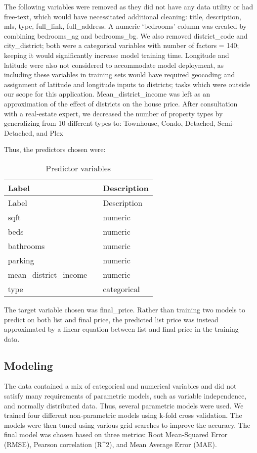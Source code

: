 \documentclass[11pt,]{article}
\begin{document}
The following variables were removed as they did not have any data
utility or had free-text, which would have necessitated additional
cleaning: title, description, mls, type, full\_link, full\_address. A
numeric `bedrooms' column was created by combining bedrooms\_ag and
bedrooms\_bg. We also removed district\_code and city\_district; both
were a categorical variables with number of factors = 140; keeping it
would significantly increase model training time. Longitude and latitude
were also not considered to accommodate model deployment, as including
these variables in training sets would have required geocoding and
assignment of latitude and longitude inputs to districts; tasks which
were outside our scope for this application. Mean\_district\_income was
left as an approximation of the effect of districts on the house price.
After consultation with a real-estate expert, we decreased the number of
property types by generalizing from 10 different types to: Townhouse,
Condo, Detached, Semi-Detached, and Plex

Thus, the predictors chosen were:

\begin{longtable}[]{@{}lll@{}}
\caption{Predictor variables}\tabularnewline
\toprule
Label & & Description\tabularnewline
\midrule
\endfirsthead
\toprule
Label & & Description\tabularnewline
\midrule
\endhead
sqft & & numeric\tabularnewline
beds & & numeric\tabularnewline
bathrooms & & numeric\tabularnewline
parking & & numeric\tabularnewline
mean\_district\_income & & numeric\tabularnewline
type & & categorical\tabularnewline
\bottomrule
\end{longtable}

The target variable chosen was final\_price. Rather than training two
models to predict on both list and final price, the predicted list price
was instead approximated by a linear equation between list and final
price in the training data.

\hypertarget{modeling}{%
\subsection{Modeling}\label{modeling}}

The data contained a mix of categorical and numerical variables and did
not satisfy many requirements of parametric models, such as variable
independence, and normally distributed data. Thus, several parametric
models were used. We trained four different non-parametric models using
k-fold cross validation. The models were then tuned using various grid
searches to improve the accuracy. The final model was chosen based on
three metrics: Root Mean-Squared Error (RMSE), Pearson correlation
(R\^{}2), and Mean Average Error (MAE).
\end{document}
